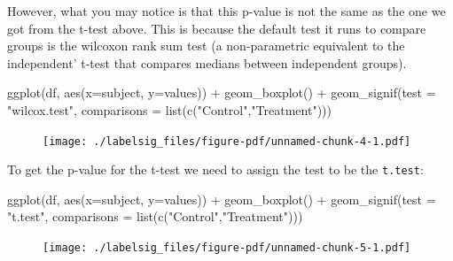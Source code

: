 \documentclass[
  letterpaper,
  DIV=11,
  numbers=noendperiod]{scrreprt}
\newenvironment{Shaded}{\begin{snugshade}}{\end{snugshade}}
\newcommand{\AttributeTok}[1]{\textcolor[rgb]{0.40,0.45,0.13}{#1}}
\newcommand{\FunctionTok}[1]{\textcolor[rgb]{0.28,0.35,0.67}{#1}}
\newcommand{\NormalTok}[1]{\textcolor[rgb]{0.00,0.23,0.31}{#1}}
\newcommand{\SpecialCharTok}[1]{\textcolor[rgb]{0.37,0.37,0.37}{#1}}
\newcommand{\StringTok}[1]{\textcolor[rgb]{0.13,0.47,0.30}{#1}}
\begin{document}
However, what you may notice is that this p-value is not the same as the
one we got from the t-test above. This is because the default test it
runs to compare groups is the wilcoxon rank sum test (a non-parametric
equivalent to the independent' t-test that compares medians between
independent groups).

\begin{Shaded}
\begin{Highlighting}[]
\FunctionTok{ggplot}\NormalTok{(df, }\FunctionTok{aes}\NormalTok{(}\AttributeTok{x=}\NormalTok{subject, }\AttributeTok{y=}\NormalTok{values)) }\SpecialCharTok{+}
  \FunctionTok{geom\_boxplot}\NormalTok{() }\SpecialCharTok{+}
  \FunctionTok{geom\_signif}\NormalTok{(}\AttributeTok{test =} \StringTok{"wilcox.test"}\NormalTok{, }
              \AttributeTok{comparisons =} \FunctionTok{list}\NormalTok{(}\FunctionTok{c}\NormalTok{(}\StringTok{"Control"}\NormalTok{,}\StringTok{"Treatment"}\NormalTok{)))}
\end{Highlighting}
\end{Shaded}

\begin{figure}[H]

{\centering \texttt{[image: ./labelsig\_files/figure-pdf/unnamed-chunk-4-1.pdf]}

}

\end{figure}

To get the p-value for the t-test we need to assign the test to be the
\texttt{t.test}:

\begin{Shaded}
\begin{Highlighting}[]
\FunctionTok{ggplot}\NormalTok{(df, }\FunctionTok{aes}\NormalTok{(}\AttributeTok{x=}\NormalTok{subject, }\AttributeTok{y=}\NormalTok{values)) }\SpecialCharTok{+}
  \FunctionTok{geom\_boxplot}\NormalTok{() }\SpecialCharTok{+}
  \FunctionTok{geom\_signif}\NormalTok{(}\AttributeTok{test =} \StringTok{"t.test"}\NormalTok{, }
              \AttributeTok{comparisons =} \FunctionTok{list}\NormalTok{(}\FunctionTok{c}\NormalTok{(}\StringTok{"Control"}\NormalTok{,}\StringTok{"Treatment"}\NormalTok{)))}
\end{Highlighting}
\end{Shaded}

\begin{figure}[H]

{\centering \texttt{[image: ./labelsig\_files/figure-pdf/unnamed-chunk-5-1.pdf]}

}

\end{figure}
\end{document}
